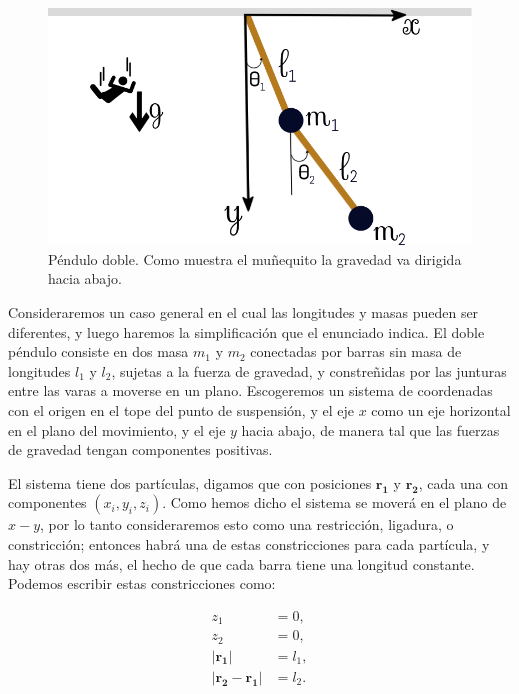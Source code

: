 \documentclass[a4paper,10pt]{article}
\numberwithin{equation}{section}
\begin{document}
\begin{figure}[H]
\center
\includegraphics[scale=0.4]{problema2fig1}
\caption{Péndulo doble. Como muestra el muñequito la gravedad va dirigida hacia 
abajo.}
\label{fig:problema2fig1}
\end{figure}


Consideraremos un caso general en el cual las longitudes y masas pueden ser diferentes,
y luego haremos la simplificación que el enunciado indica. El doble péndulo consiste 
en dos masa $m_1$ y $m_2$ conectadas por barras sin masa de longitudes $l_1$ y $l_2$,
sujetas a la fuerza de gravedad, y constreñidas por las junturas entre las varas
a moverse en un plano. Escogeremos un sistema de coordenadas con el origen en el 
tope del punto de suspensión, y el eje $x$ como un eje horizontal en el plano del 
movimiento, y el eje $y$ hacia abajo, de manera tal que las fuerzas de gravedad 
tengan componentes positivas.

\vspace{.3cm}

El sistema tiene dos partículas, digamos que con posiciones $\mathbf{r_1}$ y $\mathbf{r_2}$,
cada una con componentes $(x_i,y_i,z_i)$. Como hemos dicho el sistema se moverá 
en el plano de $x-y$, por lo tanto consideraremos esto como una restricción, ligadura,
o constricción; entonces habrá una de estas constricciones para cada partícula, y 
hay otras dos más, el hecho de que cada barra tiene una longitud constante. Podemos 
escribir estas constricciones como:

\begin{align}
 z_1 &= 0, \\
 z_2 &= 0, \\
 |\mathbf{r_1}| &= l_1, \\
 |\mathbf{r_2} - \mathbf{r_1}| &= l_2.
 \label{eq:pendu1}
\end{align}
\end{document}
